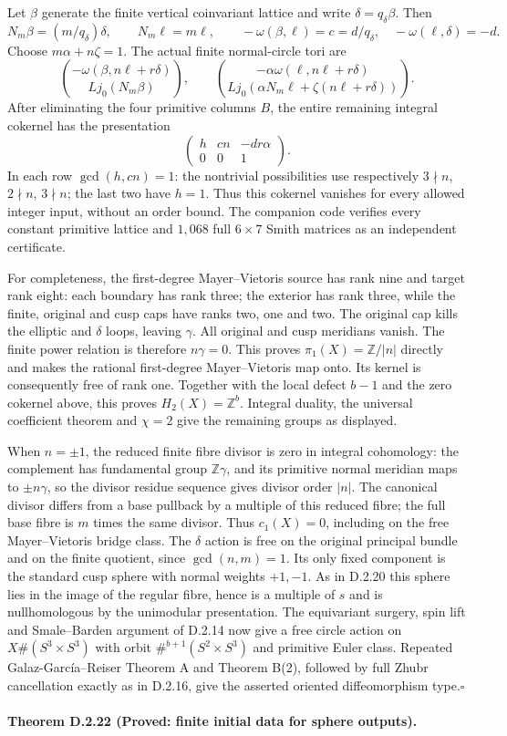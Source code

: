 Let $\beta$ generate the finite vertical coinvariant lattice and write
$\delta=q_\delta\beta$. Then
\[
 N_m\beta=(m/q_\delta)\delta,\qquad N_m\ell=m\ell,
 \qquad -\omega(\beta,\ell)=c=d/q_\delta,\quad
 -\omega(\ell,\delta)=-d.
\]
Choose $m\alpha+n\zeta=1$. The actual finite normal-circle tori are
\[
 \binom{-\omega(\beta,n\ell+r\delta)}{Lj_0(N_m\beta)},\qquad
 \binom{-\alpha\omega(\ell,n\ell+r\delta)}
 {Lj_0(\alpha N_m\ell+\zeta(n\ell+r\delta))}.
\]
After eliminating the four primitive columns $B$, the entire remaining
integral cokernel has the presentation
\[
                 \begin{pmatrix}h&cn&-dr\alpha\\0&0&1\end{pmatrix}.
\]
In each row $\gcd(h,cn)=1$: the nontrivial possibilities use respectively
$3\nmid n$, $2\nmid n$, $3\nmid n$; the last two have $h=1$.
Thus this cokernel vanishes for every allowed integer input, without an
order bound. The companion code verifies every constant primitive lattice
and $1,068$ full $6\times7$ Smith matrices as an independent certificate.

For completeness, the first-degree Mayer--Vietoris source has rank nine
and target rank eight: each boundary has rank three; the exterior has
rank three, while the finite, original and cusp caps have ranks two,
one and two. The original cap kills the elliptic and $\delta$ loops,
leaving $\gamma$. All original and cusp meridians vanish. The finite
power relation is therefore $n\gamma=0$. This proves
$\pi_1(X)=\mathbb Z/|n|$ directly and makes the rational first-degree
Mayer--Vietoris map onto. Its kernel is consequently free of rank one.
Together with the local defect $b-1$ and the zero cokernel above, this
proves $H_2(X)=\mathbb Z^b$. Integral duality, the universal coefficient
theorem and $\chi=2$ give the remaining groups as displayed.

When $n=\pm1$, the reduced finite fibre divisor is zero in integral
cohomology: the complement has fundamental group $\mathbb Z\gamma$,
and its primitive normal meridian maps to $\pm n\gamma$, so the divisor
residue sequence gives divisor order $|n|$. The canonical divisor differs
from a base pullback by a multiple of this reduced fibre; the full base
fibre is $m$ times the same divisor. Thus $c_1(X)=0$, including on the free
Mayer--Vietoris bridge class. The $\delta$ action is free on the original
principal bundle and on the finite quotient, since $\gcd(n,m)=1$.
Its only fixed component is the standard cusp sphere with normal weights
$+1,-1$. As in D.2.20 this sphere lies in the image of the regular fibre,
hence is a multiple of $s$ and is nullhomologous by the unimodular
presentation. The equivariant surgery, spin lift and Smale--Barden
argument of D.2.14 now give a free circle action on
$X\#(S^3\times S^3)$ with orbit
$\#^{b+1}(S^2\times S^3)$ and primitive Euler class.
Repeated Galaz-Garc\'ia--Reiser Theorem A and Theorem B(2), followed by
full Zhubr cancellation exactly as in D.2.16, give the asserted oriented
diffeomorphism type.\hfill$\square$


\paragraph{Theorem D.2.22 (Proved: finite initial data for sphere outputs).}
